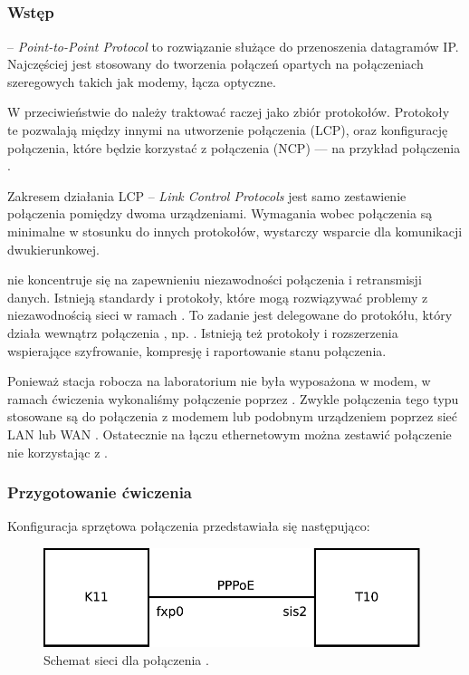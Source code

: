 \subsection{\ppp}


\subsubsection{Wstęp}

\ppp{} -- \emph{Point-to-Point Protocol} to rozwiązanie służące do
przenoszenia datagramów IP. Najczęściej jest stosowany do tworzenia połączeń
opartych na połączeniach szeregowych takich jak modemy, łącza
optyczne\cite{ppp:stevens-ppp}.

W przeciwieństwie do \arp{} \ppp{} należy traktować raczej jako zbiór
protokołów. Protokoły te pozwalają między innymi na utworzenie połączenia
\ppp{} (LCP), oraz konfigurację połączenia, które będzie korzystać z
połączenia \ppp{} (NCP) --- na przykład połączenia \ip.

Zakresem działania LCP -- \emph{Link Control Protocols} jest samo zestawienie
połączenia pomiędzy dwoma urządzeniami. Wymagania wobec połączenia są
minimalne w stosunku do innych protokołów, wystarczy wsparcie dla komunikacji
dwukierunkowej.

\ppp{} nie koncentruje się na zapewnieniu niezawodności połączenia i
retransmisji danych. Istnieją standardy i protokoły, które mogą rozwiązywać
problemy z niezawodnością sieci w ramach \ppp{}. To zadanie jest delegowane do
protokółu, który działa wewnątrz połączenia \ppp{}, np. \ip{}. Istnieją też
protokoły i rozszerzenia \ppp{} wspierające szyfrowanie, kompresję i
raportowanie stanu połączenia.

Ponieważ stacja robocza na laboratorium nie była wyposażona w modem, w ramach
ćwiczenia \ppp{} wykonaliśmy połączenie \tcp{} poprzez \pppoe{}. Zwykle
połączenia tego typu stosowane są do połączenia z modemem lub podobnym
urządzeniem poprzez sieć LAN lub WAN \cite{ppp:stevens-pppoe}. Ostatecznie na
łączu ethernetowym można zestawić połączenie \tcp{} nie korzystając z \ppp{}.


\subsubsection{Przygotowanie ćwiczenia}

Konfiguracja sprzętowa połączenia przedstawiała się następująco:

\begin{figure}[h!]
  \centering
  \includegraphics[width=11cm]{figury/ppp/schemat-przed.pdf}
  \caption{Schemat sieci dla połączenia \ppp.}
  \label{fig:ppp:schemat-sieci-przed}
\end{figure}

